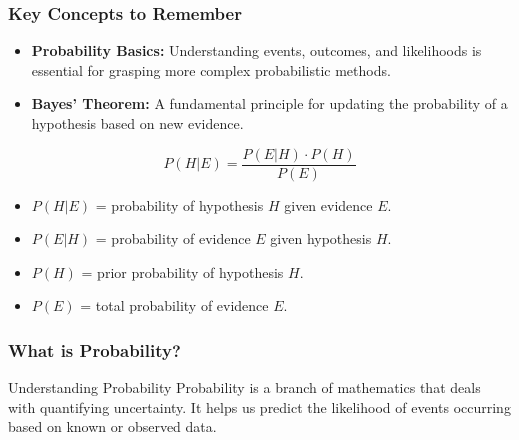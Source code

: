 \documentclass[aspectratio=169]{beamer}
\begin{document}
\begin{frame}[fragile]
    \frametitle{Key Concepts to Remember}
    \begin{itemize}
        \item \textbf{Probability Basics:} Understanding events, outcomes, and likelihoods is essential for grasping more complex probabilistic methods.
        \item \textbf{Bayes' Theorem:} A fundamental principle for updating the probability of a hypothesis based on new evidence.
    \end{itemize}
    \begin{equation}
        P(H|E) = \frac{P(E|H) \cdot P(H)}{P(E)}
    \end{equation}
    \begin{itemize}
        \item \(P(H|E)\) = probability of hypothesis \(H\) given evidence \(E\).
        \item \(P(E|H)\) = probability of evidence \(E\) given hypothesis \(H\).
        \item \(P(H)\) = prior probability of hypothesis \(H\).
        \item \(P(E)\) = total probability of evidence \(E\).
    \end{itemize}
\end{frame}

\begin{frame}[fragile]
    \frametitle{What is Probability?}
    \begin{block}{Understanding Probability}
        Probability is a branch of mathematics that deals with quantifying uncertainty. It helps us predict the likelihood of events occurring based on known or observed data.
    \end{block}
\end{frame}
\end{document}
